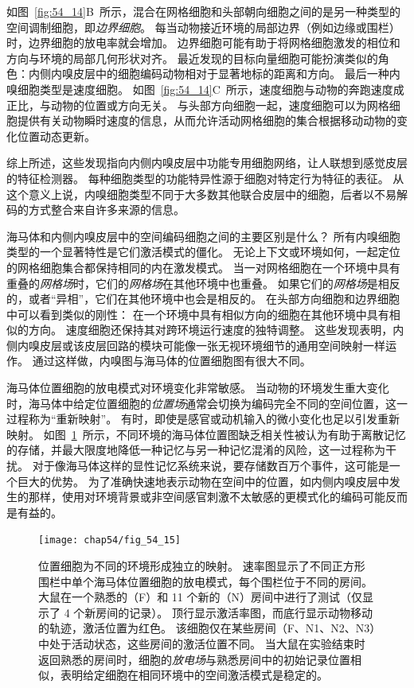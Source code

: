 如图~\ref{fig:54_14}B~所示，混合在网格细胞和头部朝向细胞之间的是另一种类型的空间调制细胞，即\textit{边界细胞}。
每当动物接近环境的局部边界（例如边缘或围栏）时，边界细胞的放电率就会增加。
边界细胞可能有助于将网格细胞激发的相位和方向与环境的局部几何形状对齐。
最近发现的目标向量细胞可能扮演类似的角色：内侧内嗅皮层中的细胞编码动物相对于显著地标的距离和方向。
最后一种内嗅细胞类型是速度细胞。
如图~\ref{fig:54_14}C~所示，速度细胞与动物的奔跑速度成正比，与动物的位置或方向无关。
与头部方向细胞一起，速度细胞可以为网格细胞提供有关动物瞬时速度的信息，从而允许活动网格细胞的集合根据移动动物的变化位置动态更新。


综上所述，这些发现指向内侧内嗅皮层中功能专用细胞网络，让人联想到感觉皮层的特征检测器。
每种细胞类型的功能特异性源于细胞对特定行为特征的表征。
从这个意义上说，内嗅细胞类型不同于大多数其他联合皮层中的细胞，后者以不易解码的方式整合来自许多来源的信息。


海马体和内侧内嗅皮层中的空间编码细胞之间的主要区别是什么？
所有内嗅细胞类型的一个显著特性是它们激活模式的僵化。
无论上下文或环境如何，一起定位的网格细胞集合都保持相同的内在激发模式。
当一对网格细胞在一个环境中具有重叠的\textit{网格场}时，它们的\textit{网格场}在其他环境中也重叠。
如果它们的\textit{网格场}是相反的，或者“异相”，它们在其他环境中也会是相反的。
在头部方向细胞和边界细胞中可以看到类似的刚性：
在一个环境中具有相似方向的细胞在其他环境中具有相似的方向。
速度细胞还保持其对跨环境运行速度的独特调整。
这些发现表明，内侧内嗅皮层或该皮层回路的模块可能像一张无视环境细节的通用空间映射一样运作。
通过这样做，内嗅图与海马体的位置细胞图有很大不同。


海马体位置细胞的放电模式对环境变化非常敏感。
当动物的环境发生重大变化时，海马体中给定位置细胞的\textit{位置场}通常会切换为编码完全不同的空间位置，这一过程称为“重新映射”。
有时，即使是感官或动机输入的微小变化也足以引发重新映射。
如图~\ref{fig:54_15}~所示，不同环境的海马体位置图缺乏相关性被认为有助于离散记忆的存储，并最大限度地降低一种记忆与另一种记忆混淆的风险，这一过程称为干扰。
对于像海马体这样的显性记忆系统来说，要存储数百万个事件，这可能是一个巨大的优势。
为了准确快速地表示动物在空间中的位置，如内侧内嗅皮层中发生的那样，使用对环境背景或非空间感官刺激不太敏感的更模式化的编码可能反而是有益的。


\begin{figure}[htbp]
	\centering
	\texttt{[image: chap54/fig\_54\_15]}
	\caption{位置细胞为不同的环境形成独立的映射。
		速率图显示了不同正方形围栏中单个海马体位置细胞的放电模式，每个围栏位于不同的房间。
		大鼠在一个熟悉的（F）和 11 个新的（N）房间中进行了测试（仅显示了 4 个新房间的记录）。
		顶行显示激活率图，而底行显示动物移动的轨迹，激活位置为红色。
		该细胞仅在某些房间（F、N1、N2、N3）中处于活动状态，这些房间的激活位置不同。
		当大鼠在实验结束时返回熟悉的房间时，细胞的\textit{放电场}与熟悉房间中的初始记录位置相似，表明给定细胞在相同环境中的空间激活模式是稳定的\cite{alme2014place}。}
	\label{fig:54_15}
\end{figure}



